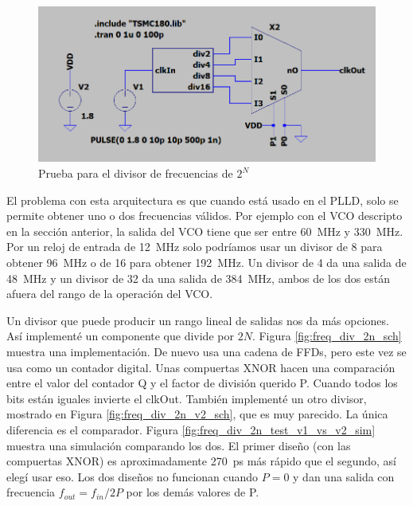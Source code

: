 \documentclass[a4paper]{article}
\begin{document}
\begin{figure}[!htb]
\centering
\includegraphics[scale=0.4]{./img/freq_div_power_2_test_sch}
\caption{Prueba para el divisor de frecuencias de $2^N$ }
\label{fig:freq_div_power_2_test_sch}
\end{figure}

El problema con esta arquitectura es que cuando está usado en el PLLD, solo se permite obtener uno o dos frecuencias válidos. Por ejemplo con el VCO descripto en la sección anterior, la salida del VCO tiene que ser entre \SI{60}{\mega\hertz} y \SI{330}{\mega\hertz}. Por un reloj de entrada de \SI{12}{\mega\hertz} solo podríamos usar un divisor de 8 para obtener \SI{96}{\mega\hertz} o de 16 para obtener \SI{192}{\mega\hertz}. Un divisor de 4 da una salida de \SI{48}{\mega\hertz} y un divisor de 32 da una salida de \SI{384}{\mega\hertz}, ambos de los dos están afuera del rango de la operación del VCO.

Un divisor que puede producir un rango lineal de salidas nos da más opciones. Así implementé un componente que divide por $2N$. Figura \ref{fig:freq_div_2n_sch} muestra una implementación. De nuevo usa una cadena de FFDs, pero este vez se usa como un contador digital. Unas compuertas XNOR hacen una comparación entre el valor del contador Q y el factor de división querido P. Cuando todos los bits están iguales invierte el clkOut. También implementé un otro divisor, mostrado en Figura \ref{fig:freq_div_2n_v2_sch}, que es muy parecido. La única diferencia es el comparador. Figura \ref{fig:freq_div_2n_test_v1_vs_v2_sim} muestra una simulación comparando los dos. El primer diseño (con las compuertas XNOR) es aproximadamente \SI{270}{\pico\second} más rápido que el segundo, así elegí usar eso. Los dos diseños no funcionan cuando $P = 0$ y dan una salida con frecuencia $f_{out} = f_{in} / 2P$ por los demás valores de P.
\end{document}
